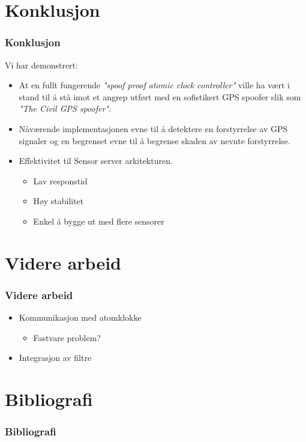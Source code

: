 \documentclass[xcolor=table]{beamer}
\begin{document}
\section{Konklusjon}
\begin{frame}
  \frametitle{Konklusjon}
  Vi har demonstrert:
  \begin{itemize}
    \item At en fullt fungerende \textit{"spoof proof atomic clock controller"} ville ha vært i stand til å stå imot et angrep utført med en sofistikert GPS spoofer slik som \textit{"The Civil GPS spoofer"}.
    \item Nåværende implementasjonen evne til å detektere en forstyrrelse av GPS signaler og en begrenset evne til å begrense skaden av nevnte forstyrrelse.
    \item Effektivitet til Sensor server arkitekturen. 
    \begin{itemize}
      \item Lav responstid
      \item Høy stabilitet 
      \item Enkel å bygge ut med flere sensorer
    \end{itemize}
  \end{itemize}
\end{frame}

\section{Videre arbeid}
\begin{frame}
    \frametitle{Videre arbeid}
  \begin{itemize}
  \item Kommunikasjon med atomklokke
    \begin{itemize}
      \item Fastvare problem?
    \end{itemize}
  \item Integrasjon av filtre
  \end{itemize}
\end{frame}

\section{Bibliografi}
\begin{frame}[allowframebreaks]%
  \frametitle{Bibliografi}
  \printbibliography[heading=bibintoc]
\end{frame}
\end{document}
